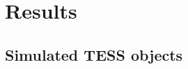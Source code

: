 \documentclass[12pt]{report}
\begin{document}
\chapter{Results}

\section{Simulated TESS objects}
	
\end{document}
